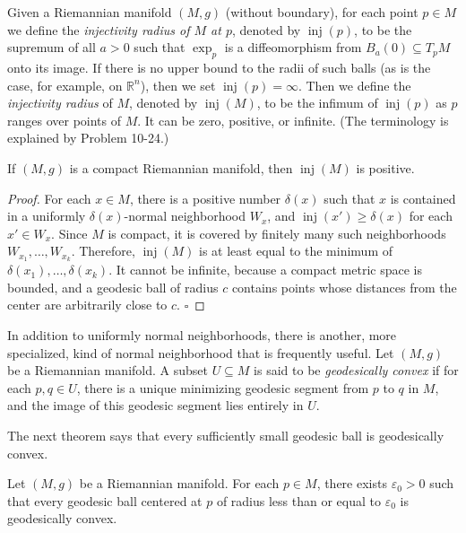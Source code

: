 Given a Riemannian manifold $(M, g)$ (without boundary), for each point $p \in M$ we define the \emph{injectivity radius of $M$ at $p$}, denoted by $\operatorname{inj}(p)$, to be the supremum of all $a > 0$ such that $\exp_p$ is a diffeomorphism from $B_a(0) \subseteq T_p M$ onto its image. If there is no upper bound to the radii of such balls (as is the case, for example, on $\mathbb{R}^n$), then we set $\operatorname{inj}(p) = \infty$. Then we define the \emph{injectivity radius} of $M$, denoted by $\operatorname{inj}(M)$, to be the infimum of $\operatorname{inj}(p)$ as $p$ ranges over points of $M$. It can be zero, positive, or infinite. (The terminology is explained by Problem 10-24.)

\begin{lemma}
\label{lem:compact-injectivity-radius-positive}

If $(M, g)$ is a compact Riemannian manifold, then $\operatorname{inj}(M)$ is positive.
\end{lemma}

\begin{proof}
For each $x \in M$, there is a positive number $\delta(x)$ such that $x$ is contained in a uniformly $\delta(x)$-normal neighborhood $W_x$, and $\operatorname{inj}(x') \geq \delta(x)$ for each $x' \in W_x$. Since $M$ is compact, it is covered by finitely many such neighborhoods $W_{x_1}, \ldots, W_{x_k}$. Therefore, $\operatorname{inj}(M)$ is at least equal to the minimum of $\delta(x_1), \ldots, \delta(x_k)$. It cannot be infinite, because a compact metric space is bounded, and a geodesic ball of radius $c$ contains points whose distances from the center are arbitrarily close to $c$. $\square$
\end{proof}

In addition to uniformly normal neighborhoods, there is another, more specialized, kind of normal neighborhood that is frequently useful. Let $(M, g)$ be a Riemannian manifold. A subset $U \subseteq M$ is said to be \emph{geodesically convex} if for each $p, q \in U$, there is a unique minimizing geodesic segment from $p$ to $q$ in $M$, and the image of this geodesic segment lies entirely in $U$.

The next theorem says that every sufficiently small geodesic ball is geodesically convex.

\begin{theorem}
\label{thm:small-geodesic-ball-convex}
Let $(M, g)$ be a Riemannian manifold. For each $p \in M$, there exists $\varepsilon_0 > 0$ such that every geodesic ball centered at $p$ of radius less than or equal to $\varepsilon_0$ is geodesically convex.
\end{theorem}

